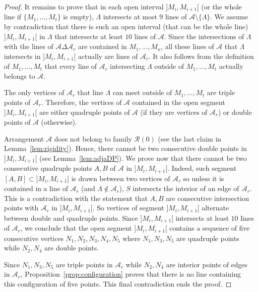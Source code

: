\documentclass[a4paper,11pt,reqno]{amsart}
\theoremstyle{definition}
\theoremstyle{remark}
\theoremstyle{definition}
\theoremstyle{definition}
\theoremstyle{definition}
\numberwithin{equation}{section}
\begin{document}
\begin{proof}
It remains to prove that in each open interval $]M_{i},M_{i+1}[$ (or the whole line if $\lbrace{ M_{1},\dots,M_{t} \rbrace}$ is empty), $\Lambda$ intersects at most $9$ lines of $\mathcal{A} \setminus \lbrace{ \Lambda \rbrace}$. We assume by contradiction that there is such an open interval (that can be the whole line) $]M_{i},M_{i+1}[$ in $\Lambda$ that intersects at least $10$ lines of $\mathcal{A}$. Since the intersections of $\Lambda$ with the lines of $\mathcal{A} \Delta \mathcal{A}_{r}$ are contained in $M_{1},\dots,M_{n}$, all these lines of $\mathcal{A}$ that $\Lambda$ intersects in $]M_{i},M_{i+1}[$ actually are lines of  $\mathcal{A}_{r}$. It also follows from the definition of $M_{1},\dots,M_{t}$ that every line of $\mathcal{A}_{r}$ intersecting $\Lambda$ outside of $M_{1},\dots,M_{t}$ actually belongs to $\mathcal{A}$.
\par
The only vertices of $\mathcal{A}_{r}$ that line $\Lambda$ can meet outside of $M_{1},\dots,M_{t}$ are triple points of $\mathcal{A}_{r}$. Therefore, the vertices of $\mathcal{A}$ contained in the open segment $]M_{i},M_{i+1}[$ are either quadruple points of $\mathcal{A}$ (if they are vertices of $\mathcal{A}_{r}$) or double points of $\mathcal{A}$ (otherwise).
\par
Arrangement $\mathcal{A}$ does not belong to family $\mathcal{R}(0)$ (see the last claim in Lemma~\ref{lem:rigidity}). Hence, there cannot be two consecutive double points in $]M_{i},M_{i+1}[$ (see Lemma~\ref{lem:adjaDP}). We prove now that there cannot be two consecutive quadruple points $A,B$ of $\mathcal{A}$ in $]M_{i},M_{i+1}[$. Indeed, such segment $[A,B] \subset ]M_{i},M_{i+1}[$ is drawn between two vertices of $\mathcal{A}_{r}$ so unless it is contained in a line of $\mathcal{A}_{r}$ (and $\Lambda \notin \mathcal{A}_{r}$), $S$ intersects the interior of an edge of $\mathcal{A}_{r}$. This is a contradiction with the statement that $A,B$ are consecutive intersection points with $\mathcal{A}_{r}$ in $]M_{i},M_{i+1}[$. So vertices of segment $]M_{i},M_{i+1}[$ alternate between double and quadruple points. Since $]M_{i},M_{i+1}[$ intersects at least $10$ lines of $\mathcal{A}_{r}$, we conclude that the open segment $]M_{i},M_{i+1}[$ contains a sequence of five consecutive vertices $N_{1},N_{2},N_{3},N_{4},N_{5}$ where $N_{1},N_{3},N_{5}$ are quadruple points while $N_{2},N_{4}$ are double points.
\par
Since $N_{1},N_{3},N_{5}$ are triple points in $\mathcal{A}_{r}$ while $N_{2},N_{4}$ are interior points of edges in $\mathcal{A}_{r}$, Proposition~\ref{prop:configuration} proves that there is no line containing this configuration of five points. This final contradiction ends the proof.
\end{proof}
\end{document}

